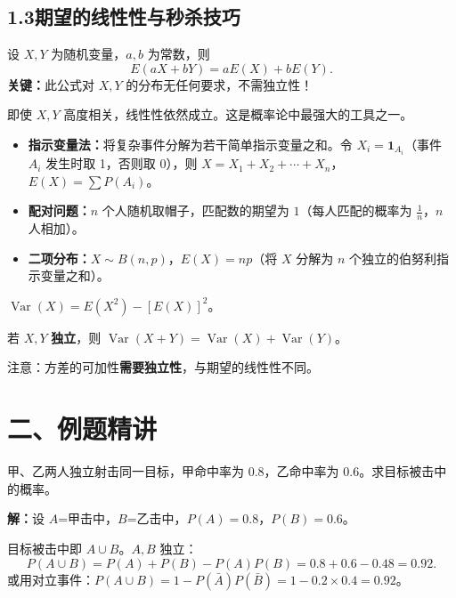 \documentclass[12pt, a4paper]{ctexart}
\begin{document}
\subsection*{1.3\quad 期望的线性性与秒杀技巧}

\begin{knowledgebox}[期望的线性性]
设 $X,Y$ 为随机变量，$a,b$ 为常数，则
\[
E(aX+bY)=aE(X)+bE(Y).
\]
\textbf{关键：}此公式对 $X,Y$ 的分布无任何要求，不需独立性！\par
即使 $X,Y$ 高度相关，线性性依然成立。这是概率论中最强大的工具之一。
\end{knowledgebox}

\begin{tipbox}[期望线性性的秒杀场景]
\begin{itemize}[leftmargin=1.5em]
  \item \textbf{指示变量法：}将复杂事件分解为若干简单指示变量之和。令 $X_i=\mathbf{1}_{A_i}$（事件 $A_i$ 发生时取 1，否则取 0），则 $X=X_1+X_2+\cdots+X_n$，$E(X)=\sum P(A_i)$。
  \item \textbf{配对问题：}$n$ 个人随机取帽子，匹配数的期望为 $1$（每人匹配的概率为 $\frac{1}{n}$，$n$ 人相加）。
  \item \textbf{二项分布：}$X\sim B(n,p)$，$E(X)=np$（将 $X$ 分解为 $n$ 个独立的伯努利指示变量之和）。
\end{itemize}
\end{tipbox}

\begin{knowledgebox}[方差与期望的关系]
$\operatorname{Var}(X)=E(X^2)-[E(X)]^2$。\par
若 $X,Y$ \textbf{独立}，则 $\operatorname{Var}(X+Y)=\operatorname{Var}(X)+\operatorname{Var}(Y)$。\par
注意：方差的可加性\textbf{需要独立性}，与期望的线性性不同。
\end{knowledgebox}

\section*{\textcolor{examorange}{二、例题精讲}}

\begin{examplebox}[【例题1】加法公式基础]
甲、乙两人独立射击同一目标，甲命中率为 $0.8$，乙命中率为 $0.6$。求目标被击中的概率。
\end{examplebox}

\textbf{解：}\quad 设 $A$=甲击中，$B$=乙击中，$P(A)=0.8$，$P(B)=0.6$。\par
目标被击中即 $A\cup B$。$A,B$ 独立：
\[
P(A\cup B)=P(A)+P(B)-P(A)P(B)=0.8+0.6-0.48=0.92.
\]
或用对立事件：$P(A\cup B)=1-P(\bar{A})P(\bar{B})=1-0.2\times0.4=0.92$。
\end{document}
